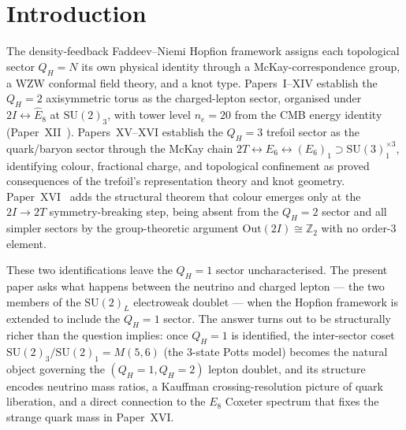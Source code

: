 \documentclass[11pt,a4paper]{article}
\theoremstyle{definition}\newtheorem{definition}[theorem]{Definition}
\theoremstyle{remark}
\newcommand{\SU}{\mathrm{SU}}
\newcommand{\twoI}{2I}
\newcommand{\twoT}{2T}
\newcommand{\QH}{Q_H}
\newcommand{\Ztwo}{\mathbb{Z}_2}
\begin{document}
\section{Introduction}
\label{P17:sec:intro}

The density-feedback Faddeev--Niemi Hopfion framework assigns each
topological sector $\QH=N$ its own physical identity through a
McKay-correspondence group, a WZW conformal field theory, and a knot
type. Papers~I--XIV establish the $\QH=2$ axisymmetric torus as the
charged-lepton sector, organised under $\twoI\leftrightarrow\widehat{E}_8$
at $\SU(2)_3$, with tower level $n_e=20$ from the CMB energy identity
(Paper~XII~\cite{Paper12}). Papers~XV--XVI establish the $\QH=3$
trefoil sector as the quark/baryon sector through the McKay chain
$\twoT\leftrightarrow E_6\leftrightarrow(E_6)_1\supset\SU(3)_1^{\times3}$,
identifying colour, fractional charge, and topological confinement as
proved consequences of the trefoil's representation theory and knot
geometry. Paper~XVI~\cite{Paper16} adds the structural theorem that colour
emerges only at the $\twoI\to\twoT$ symmetry-breaking step, being absent
from the $\QH=2$ sector and all simpler sectors by the group-theoretic
argument $\mathrm{Out}(\twoI)\cong\Ztwo$ with no order-$3$ element.

These two identifications leave the $\QH=1$ sector uncharacterised.
The present paper asks what happens between the neutrino and charged
lepton --- the two members of the $\SU(2)_L$ electroweak doublet --- when
the Hopfion framework is extended to include the $\QH=1$ sector.  The
answer turns out to be structurally richer than the question implies:
once $\QH=1$ is identified, the inter-sector coset
$\SU(2)_3/\SU(2)_1=M(5,6)$ (the 3-state Potts model) becomes the
natural object governing the $(\QH=1,\QH=2)$ lepton doublet, and its
structure encodes neutrino mass ratios, a Kauffman crossing-resolution
picture of quark liberation, and a direct connection to the $E_8$
Coxeter spectrum that fixes the strange quark mass in Paper~XVI.
\end{document}
